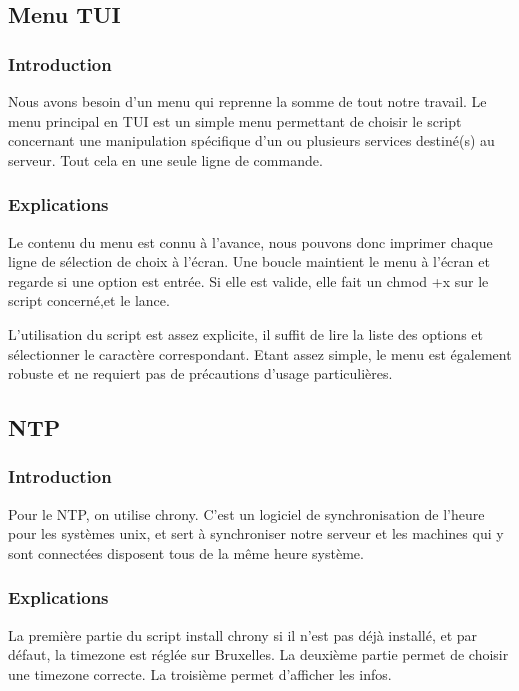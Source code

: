 \documentclass{article}
\begin{document}
%
	
	\subsection{Menu TUI}
	\subsubsection{Introduction}
	Nous avons besoin d'un menu qui reprenne la somme de tout notre travail. Le menu principal en TUI est un simple menu permettant de choisir le script concernant une manipulation spécifique d'un ou plusieurs services destiné(s) au serveur. Tout cela en une seule ligne de commande.

	\subsubsection{Explications}
	Le contenu du menu est connu à l'avance, nous pouvons donc imprimer chaque ligne de sélection de choix à l'écran.
	Une boucle maintient le menu à l'écran et regarde si une option est entrée. Si elle est valide, elle fait un chmod +x sur le script concerné,et le lance.
	
L'utilisation du script est assez explicite, il suffit de lire la liste des options et sélectionner le caractère correspondant. Etant assez simple, le menu est également robuste et ne requiert pas de précautions d'usage particulières.

 \subsection{NTP}
 \subsubsection{Introduction}
 Pour le NTP, on utilise chrony.
 C'est un logiciel de synchronisation de l'heure pour les systèmes unix, et sert à synchroniser notre serveur et les machines qui y sont connectées disposent tous de la même heure système.
 \subsubsection{Explications}
 La première partie du script install chrony si il n'est pas déjà installé, et par défaut, la timezone est réglée sur Bruxelles.
 La deuxième partie permet de choisir une timezone correcte.
 La troisième permet d'afficher les infos.
\end{document}
